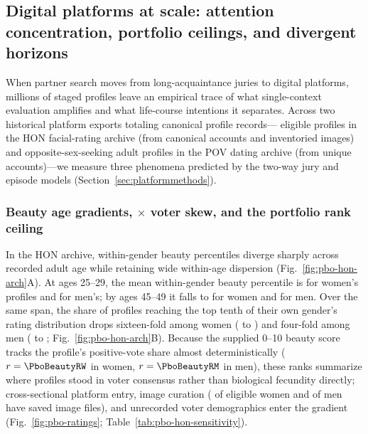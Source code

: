 \subsection{Digital platforms at scale: attention concentration, portfolio ceilings, and divergent horizons}\label{sec:attraction}

\noindent When partner search moves from long-acquaintance juries to digital platforms, millions of staged profiles leave
an empirical trace of what single-context evaluation amplifies and what life-course intentions it separates. Across two
historical platform exports totaling \PboCombinedRecords{} canonical profile records---\PboHonEligible{} eligible profiles
in the HON facial-rating archive (from \PboHonRows{} canonical accounts and \PboHonFiles{} inventoried images) and
\PboPovEligible{} opposite-sex-seeking adult profiles in the POV dating archive (from \PboPovRows{} unique accounts)---we
measure three phenomena predicted by the two-way jury and episode models (Section~\ref{sec:platformmethods}).

\subsubsection{Beauty age gradients, \PboHonAttentionRatio$\times$ voter skew, and the portfolio rank ceiling}
In the HON archive, within-gender beauty percentiles diverge sharply across recorded adult age while retaining wide
within-age dispersion (Fig.~\ref{fig:pbo-hon-arch}A). At ages 25--29, the mean within-gender beauty percentile is
\PboBeautyYoungW{} for women's profiles and \PboBeautyYoungM{} for men's; by ages 45--49 it falls to \PboBeautyOlderW{} for
women and \PboBeautyOlderM{} for men. Over the same span, the share of profiles reaching the top tenth of their own
gender's rating distribution drops sixteen-fold among women (\PboBeautyTopYoungW{} to \PboBeautyTopOlderW) and four-fold
among men (\PboBeautyTopYoungM{} to \PboBeautyTopOlderM; Fig.~\ref{fig:pbo-hon-arch}B). Because the supplied 0--10 beauty
score tracks the profile's positive-vote share almost deterministically ($r=\PboBeautyRW$ in women, $r=\PboBeautyRM$ in
men), these ranks summarize where profiles stood in voter consensus rather than biological fecundity directly; cross-sectional
platform entry, image curation (\PboImageShareW{} of eligible women and \PboImageShareM{} of men have saved image files),
and unrecorded voter demographics enter the gradient (Fig.~\ref{fig:pbo-ratings}; Table~\ref{tab:pbo-hon-sensitivity}).

